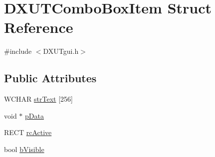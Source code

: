 \hypertarget{struct_d_x_u_t_combo_box_item}{
\section{DXUTComboBoxItem Struct Reference}
\label{struct_d_x_u_t_combo_box_item}
}


{\ttfamily \#include $<$DXUTgui.h$>$}\subsection*{Public Attributes}
\begin{DoxyCompactItemize}
\item 
WCHAR \hyperlink{struct_d_x_u_t_combo_box_item_add4f4ff25c0414b3b9c11425f54739a2}{strText} \mbox{[}256\mbox{]}
\item 
void $\ast$ \hyperlink{struct_d_x_u_t_combo_box_item_a62ebde50a72cf8b28aaedab5f942fc13}{pData}
\item 
RECT \hyperlink{struct_d_x_u_t_combo_box_item_a805429e07edf6e00edaab721af4fdc95}{rcActive}
\item 
bool \hyperlink{struct_d_x_u_t_combo_box_item_a1eb68d408cc0c561ecbcb86648bfef62}{bVisible}
\end{DoxyCompactItemize}


